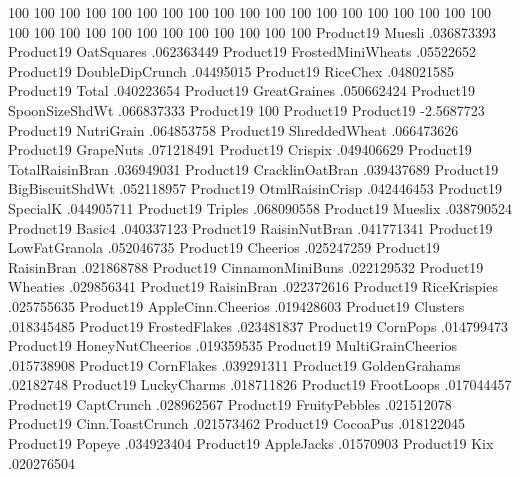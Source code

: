 100%
100%
100%
100%
100%
100%
100%
100%
100%
100%
100%
100%
100%
100%
100%
100%
100%
100%
100%
100%
100%
100%
100%
100%
100%
100%
100%
100%
100%
100%
100%
Product19	Muesli	.036873393
Product19	OatSquares	.062363449
Product19	FrostedMiniWheats	.05522652
Product19	DoubleDipCrunch	.04495015
Product19	RiceChex	.048021585
Product19	Total	.040223654
Product19	GreatGraines	.050662424
Product19	SpoonSizeShdWt	.066837333
Product19	100%
Product19	Product19	-2.5687723
Product19	NutriGrain	.064853758
Product19	ShreddedWheat	.066473626
Product19	GrapeNuts	.071218491
Product19	Crispix	.049406629
Product19	TotalRaisinBran	.036949031
Product19	CracklinOatBran	.039437689
Product19	BigBiscuitShdWt	.052118957
Product19	OtmlRaisinCrisp	.042446453
Product19	SpecialK	.044905711
Product19	Triples	.068090558
Product19	Mueslix	.038790524
Product19	Basic4	.040337123
Product19	RaisinNutBran	.041771341
Product19	LowFatGranola	.052046735
Product19	Cheerios	.025247259
Product19	RaisinBran	.021868788
Product19	CinnamonMiniBuns	.022129532
Product19	Wheaties	.029856341
Product19	RaisinBran	.022372616
Product19	RiceKrispies	.025755635
Product19	AppleCinn.Cheerios	.019428603
Product19	Clusters	.018345485
Product19	FrostedFlakes	.023481837
Product19	CornPops	.014799473
Product19	HoneyNutCheerios	.019359535
Product19	MultiGrainCheerios	.015738908
Product19	CornFlakes	.039291311
Product19	GoldenGrahams	.02182748
Product19	LuckyCharms	.018711826
Product19	FrootLoops	.017044457
Product19	CaptCrunch	.028962567
Product19	FruityPebbles	.021512078
Product19	Cinn.ToastCrunch	.021573462
Product19	CocoaPus	.018122045
Product19	Popeye	.034923404
Product19	AppleJacks	.01570903
Product19	Kix	.020276504
